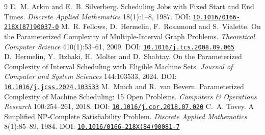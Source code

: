 \documentclass[11pt,a4paper]{article}
\theoremstyle{definition}
\newcommand{\doi}[1]{DOI: \href{https://doi.org/#1}{\nolinkurl{#1}}}
\begin{document}
\begin{thebibliography}{9}
E.~M. Arkin and E.~B. Silverberg.
\newblock Scheduling Jobs with Fixed Start and End Times.
\newblock \emph{Discrete Applied Mathematics} 18(1):1--8, 1987.
\newblock \doi{10.1016/0166-218X(87)90037-0}
M.~R. Fellows, D.~Hermelin, F.~Rosamond and S.~Vialette.
\newblock On the Parameterized Complexity of Multiple-Interval Graph Problems.
\newblock \emph{Theoretical Computer Science} 410(1):53--61, 2009.
\newblock \doi{10.1016/j.tcs.2008.09.065}
D.~Hermelin, Y.~Itzhaki, H.~Molter and D.~Shabtay.
\newblock On the Parameterized Complexity of Interval Scheduling with Eligible Machine Sets.
\newblock \emph{Journal of Computer and System Sciences} 144:103533, 2024.
\newblock \doi{10.1016/j.jcss.2024.103533}
M.~Mnich and R.~van Bevern.
\newblock Parameterized Complexity of Machine Scheduling: 15 Open Problems.
\newblock \emph{Computers \& Operations Research} 100:254--261, 2018.
\newblock \doi{10.1016/j.cor.2018.07.020}
C.~A. Tovey.
\newblock A Simplified NP-Complete Satisfiability Problem.
\newblock \emph{Discrete Applied Mathematics} 8(1):85--89, 1984.
\newblock \doi{10.1016/0166-218X(84)90081-7}
\end{thebibliography}
\end{document}
